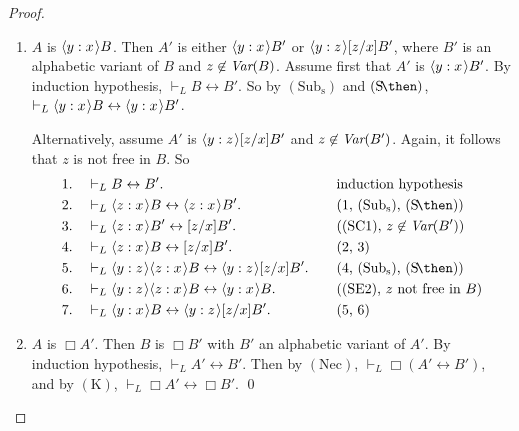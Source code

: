 \documentclass[11pt]{woarticle}
\theoremstyle{break}
\theoremstyle{nonumberplain}
\newcommand{\1}{\;\,|\;\,}
\newcommand{\var}{\emph{Var}}
\renewcommand{\t}[1]{\ensuremath{\langle #1  \makebox[.2ex]{}\rangle}}
\newcommand{\T}[1]{\ensuremath{(\mathrm{ #1})}}
\begin{document}
\begin{proof}
\begin{enumerate}
  \item $A$ is $\t{y:x} B$.\; Then $A'$ is either $\t{y:x} B'$ or
    $\t{y:z} [z/x]B'$, where $B'$ is an alphabetic variant of $B$ and
    $z\not\in \var(B)$. Assume first that $A'$ is $\t{y:x} B'$. By
    induction hypothesis, $\vdash_{L} B \leftrightarrow B'$. So by
    \T{Sub_s} and \T{S\!\then}, $\vdash_{L} \t{y:x} B \leftrightarrow
    \t{y:x} B'$.

    Alternatively, assume $A'$ is $\t{y:z} [z/x]B'$ and $z \not\in
    \var(B')$. Again, it follows that $z$ is not free in $B$. So
    \begin{alignat*}{2}
      1.\quad&\vdash_{L} B \leftrightarrow B'. &\quad&\text{induction hypothesis}\\
      2.\quad&\vdash_{L} \t{z:x}B \leftrightarrow \t{z:x}B'. 
         &\quad&\text{(1, \T{Sub_s}, \T{S\!\then})}\\
      3.\quad&\vdash_{L} \t{z:x}B' \leftrightarrow [z/x]B'.
         &\quad&\text{(\T{SC1}, $z \not\in \var(B')$)}\\
      4.\quad&\vdash_{L} \t{z:x}B \leftrightarrow [z/x]B'.
         &\quad&\text{(2, 3)}\\
      5.\quad&\vdash_{L} \t{y:z}\t{z:x}B \leftrightarrow \t{y:z}[z/x]B'. 
         &&\text{(4, \T{Sub_s}, \T{S\!\then})}\\
      6.\quad&\vdash_{L} \t{y:z}\t{z:x} B \leftrightarrow \t{y:x} B. 
         &&\text{(\T{SE2}, $z$ not free in $B$)}\\
      7.\quad&\vdash_{L} \t{y:x} B \leftrightarrow \t{y:z}[z/x]B'. 
         &&\text{(5, 6)}
    \end{alignat*}

  \item $A$ is $\Box A'$.\; Then $B$ is $\Box B'$ with $B'$ an
    alphabetic variant of $A'$. By induction hypothesis, $\vdash_{L}
    A' \leftrightarrow B'$. Then by \T{Nec}, $\vdash_{L} \Box(A'
    \leftrightarrow B')$, and by \T{K}, $\vdash_{L} \Box A'
    \leftrightarrow \Box B'$. \qed
  \end{enumerate}
\end{proof}
\end{document}
